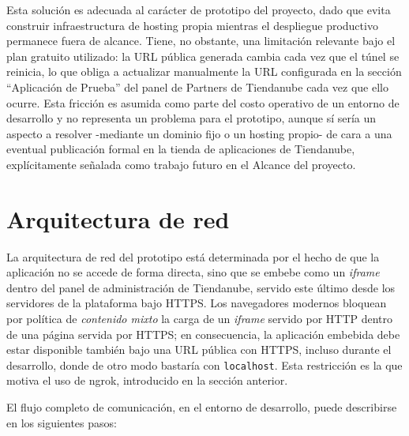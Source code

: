 Esta solución es adecuada al carácter de prototipo del proyecto, dado que evita construir infraestructura de hosting propia mientras el despliegue productivo permanece fuera de alcance. Tiene, no obstante, una limitación relevante bajo el plan gratuito utilizado: la URL pública generada cambia cada vez que el túnel se reinicia, lo que obliga a actualizar manualmente la URL configurada en la sección ``Aplicación de Prueba'' del panel de Partners de Tiendanube cada vez que ello ocurre. Esta fricción es asumida como parte del costo operativo de un entorno de desarrollo y no representa un problema para el prototipo, aunque sí sería un aspecto a resolver -mediante un dominio fijo o un hosting propio- de cara a una eventual publicación formal en la tienda de aplicaciones de Tiendanube, explícitamente señalada como trabajo futuro en el Alcance del proyecto.

\section{Arquitectura de red}
\label{sec:arquitectura-red}

La arquitectura de red del prototipo está determinada por el hecho de que la aplicación no se accede de forma directa, sino que se embebe como un \emph{iframe} dentro del panel de administración de Tiendanube, servido este último desde los servidores de la plataforma bajo HTTPS. Los navegadores modernos bloquean por política de \emph{contenido mixto} la carga de un \emph{iframe} servido por HTTP dentro de una página servida por HTTPS; en consecuencia, la aplicación embebida debe estar disponible también bajo una URL pública con HTTPS, incluso durante el desarrollo, donde de otro modo bastaría con \texttt{localhost}. Esta restricción es la que motiva el uso de ngrok, introducido en la sección anterior.

El flujo completo de comunicación, en el entorno de desarrollo, puede describirse en los siguientes pasos:


